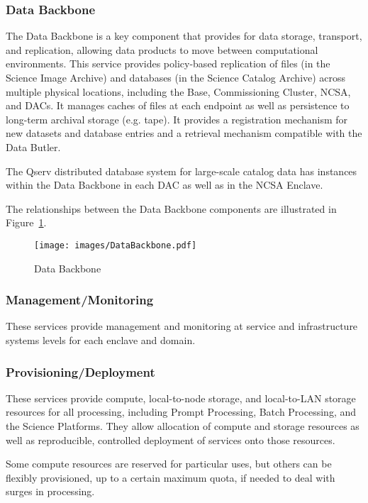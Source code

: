 \documentclass[DM,lsstdraft,toc]{lsstdoc}
\begin{document}
\subsubsection{Data Backbone}\label{data-backbone}

The Data Backbone is a key component that provides for data storage,
transport, and replication, allowing data products to move between
computational environments. This service provides policy-based
replication of files (in the Science Image Archive) and databases (in
the Science Catalog Archive) across multiple physical locations,
including the Base, Commissioning Cluster, NCSA, and DACs. It manages
caches of files at each endpoint as well as persistence to long-term
archival storage (e.g. tape). It provides a registration mechanism for
new datasets and database entries and a retrieval mechanism compatible
with the Data Butler.

The Qserv distributed database system for large-scale catalog data has
instances within the Data Backbone in each DAC as well as in the NCSA
Enclave.

The relationships between the Data Backbone components are illustrated
in Figure~\ref{fig:dbb}.

\begin{figure}
\centering
\texttt{[image: images/DataBackbone.pdf]}
\caption{Data Backbone}
\label{fig:dbb}
\end{figure}

\subsubsection{Management/Monitoring}\label{managementmonitoring}

These services provide management and monitoring at service and
infrastructure systems levels for each enclave and domain.

\subsubsection{Provisioning/Deployment}\label{provisioningdeployment}

These services provide compute, local-to-node storage, and local-to-LAN
storage resources for all processing, including Prompt Processing, Batch
Processing, and the Science Platforms. They allow allocation of compute
and storage resources as well as reproducible, controlled deployment of
services onto those resources.

Some compute resources are reserved for particular uses, but others can
be flexibly provisioned, up to a certain maximum quota, if needed to
deal with surges in processing.
\end{document}
